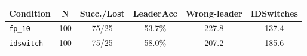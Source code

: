 \begin{tabular}{l c c c c c}
\toprule
\textbf{Condition} & \textbf{N} & \textbf{Succ./Lost} & \textbf{LeaderAcc} & \textbf{Wrong-leader} & \textbf{IDSwitches} \\
\midrule
\texttt{fp\_10} & 100 & 75/25 & 53.7\% & 227.8 & 137.4 \\
\texttt{idswitch} & 100 & 75/25 & 58.0\% & 207.2 & 185.6 \\
\bottomrule
\end{tabular}
